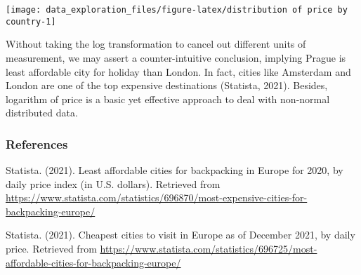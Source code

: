 \documentclass[
]{article}
\begin{document}
\begin{center}\texttt{[image: data\_exploration\_files/figure-latex/distribution of price by country-1]} \end{center}

Without taking the log transformation to cancel out different units of
measurement, we may assert a counter-intuitive conclusion, implying
Prague is least affordable city for holiday than London. In fact, cities
like Amsterdam and London are one of the top expensive destinations
(Statista, 2021). Besides, logarithm of price is a basic yet effective
approach to deal with non-normal distributed data.

\hypertarget{references}{%
\subsubsection{References}\label{references}}

Statista. (2021). Least affordable cities for backpacking in Europe for
2020, by daily price index (in U.S. dollars). Retrieved from
\url{https://www.statista.com/statistics/696870/most-expensive-cities-for-backpacking-europe/}

Statista. (2021). Cheapest cities to visit in Europe as of December
2021, by daily price. Retrieved from
\url{https://www.statista.com/statistics/696725/most-affordable-cities-for-backpacking-europe/}
\end{document}
